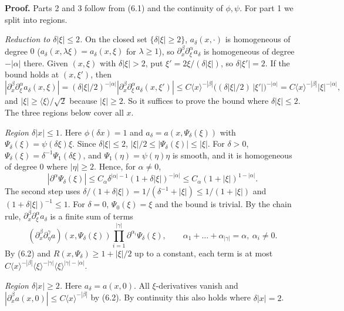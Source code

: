 \documentclass[
  11pt,
]{article}
\begin{document}
\textbf{Proof.} Parts 2 and 3 follow from (6.1) and the continuity of
\(\phi,\psi\). For part 1 we split into regions.

\emph{Reduction to \(\delta|\xi|\le2\).} On the closed set
\(\{\delta|\xi|\ge2\}\), \(a_\delta(x,\cdot)\) is homogeneous of degree
\(0\) (\(a_\delta(x,\lambda\xi)=a_\delta(x,\xi)\) for \(\lambda\ge1\)),
so \(\partial_x^\beta\partial_\xi^\alpha a_\delta\) is homogeneous of
degree \(-|\alpha|\) there. Given \((x,\xi)\) with \(\delta|\xi|>2\),
put \(\xi'=2\xi/(\delta|\xi|)\), so \(\delta|\xi'|=2\). If the bound
holds at \((x,\xi')\), then \[
|\partial_x^\beta\partial_\xi^\alpha a_\delta(x,\xi)|=(\delta|\xi|/2)^{-|\alpha|}|\partial_x^\beta\partial_\xi^\alpha a_\delta(x,\xi')|
\le C\langle x\rangle^{-|\beta|}\bigl((\delta|\xi|/2)\,|\xi'|\bigr)^{-|\alpha|}=C\langle x\rangle^{-|\beta|}|\xi|^{-|\alpha|},
\] and \(|\xi|\ge\langle\xi\rangle/\sqrt2\) because \(|\xi|\ge2\). So it
suffices to prove the bound where \(\delta|\xi|\le2\). The three regions
below cover all \(x\).

\emph{Region \(\delta|x|\le1\).} Here \(\phi(\delta x)=1\) and
\(a_\delta=a(x,\Psi_\delta(\xi))\) with
\(\Psi_\delta(\xi)=\psi(\delta\xi)\xi\). Since \(\delta|\xi|\le2\),
\(|\xi|/2\le|\Psi_\delta(\xi)|\le|\xi|\). For \(\delta>0\),
\(\Psi_\delta(\xi)=\delta^{-1}\Psi_1(\delta\xi)\), and
\(\Psi_1(\eta)=\psi(\eta)\eta\) is smooth, and it is homogeneous of
degree \(0\) where \(|\eta|\ge2\). Hence, for \(\alpha\ne0\), \[
|\partial^\alpha\Psi_\delta(\xi)|\le C_\alpha\delta^{|\alpha|-1}(1+\delta|\xi|)^{-|\alpha|}\le C_\alpha(1+|\xi|)^{1-|\alpha|}.
\] The second step uses
\(\delta/(1+\delta|\xi|)=1/(\delta^{-1}+|\xi|)\le1/(1+|\xi|)\) and
\((1+\delta|\xi|)^{-1}\le1\). For \(\delta=0\), \(\Psi_0(\xi)=\xi\) and
the bound is trivial. By the chain rule,
\(\partial_x^\beta\partial_\xi^\alpha a_\delta\) is a finite sum of
terms \[
(\partial_x^\beta\partial_\eta^\gamma a)(x,\Psi_\delta(\xi))\prod_{i=1}^{|\gamma|}\partial^{\alpha_i}\Psi_\delta(\xi),\qquad \alpha_1+\dots+\alpha_{|\gamma|}=\alpha,\ \alpha_i\ne0 .
\] By (6.2) and \(R(x,\Psi_\delta)\ge1+|\xi|/2\) up to a constant, each
term is at most
\(C\langle x\rangle^{-|\beta|}\langle\xi\rangle^{-|\gamma|}\langle\xi\rangle^{|\gamma|-|\alpha|}\).

\emph{Region \(\delta|x|\ge2\).} Here \(a_\delta=a(x,0)\). All
\(\xi\)-derivatives vanish and
\(|\partial_x^\beta a(x,0)|\le C\langle x\rangle^{-|\beta|}\) by (6.2).
By continuity this also holds where \(\delta|x|=2\).
\end{document}
